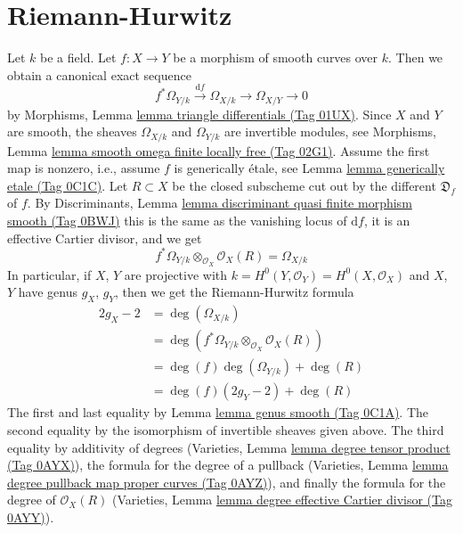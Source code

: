 \documentclass{amsart}
\theoremstyle{plain}
\theoremstyle{definition}
\theoremstyle{remark}
\numberwithin{equation}{subsection}
\begin{document}
\section{Riemann-Hurwitz}
\label{section-riemann-hurewitz}

\noindent
Let $k$ be a field. Let $f : X \to Y$ be a morphism of smooth curves over $k$.
Then we obtain a canonical exact sequence
$$
f^*\Omega_{Y/k} \xrightarrow{\text{d}f} \Omega_{X/k}
\longrightarrow \Omega_{X/Y} \longrightarrow 0
$$
by Morphisms, Lemma \href{https://stacks.math.columbia.edu/tag/01UX}{lemma triangle differentials (Tag 01UX)}.
Since $X$ and $Y$ are smooth, the sheaves $\Omega_{X/k}$ and
$\Omega_{Y/k}$ are invertible modules, see
Morphisms, Lemma \href{https://stacks.math.columbia.edu/tag/02G1}{lemma smooth omega finite locally free (Tag 02G1)}.
Assume the first map is nonzero, i.e., assume $f$ is generically
\'etale, see Lemma \href{https://stacks.math.columbia.edu/tag/0C1C}{lemma generically etale (Tag 0C1C)}. Let $R \subset X$
be the closed subscheme cut out by the different $\mathfrak{D}_f$ of $f$.
By Discriminants, Lemma
\href{https://stacks.math.columbia.edu/tag/0BWJ}{lemma discriminant quasi finite morphism smooth (Tag 0BWJ)}
this is the same as the vanishing locus of $\text{d}f$, it is
an effective Cartier divisor, and we get
$$
f^*\Omega_{Y/k} \otimes_{\mathcal{O}_X} \mathcal{O}_X(R) = \Omega_{X/k}
$$
In particular, if $X$, $Y$ are projective with
$k = H^0(Y, \mathcal{O}_Y) = H^0(X, \mathcal{O}_X)$
and $X$, $Y$ have genus $g_X$, $g_Y$, then we get the
Riemann-Hurwitz formula
\begin{align*}
2g_X - 2 & =
\deg(\Omega_{X/k}) \\
& =
\deg(f^*\Omega_{Y/k} \otimes_{\mathcal{O}_X} \mathcal{O}_X(R)) \\
& =
\deg(f) \deg(\Omega_{Y/k}) + \deg(R) \\
& =
\deg(f) (2g_Y - 2) + \deg(R)
\end{align*}
The first and last equality by Lemma \href{https://stacks.math.columbia.edu/tag/0C1A}{lemma genus smooth (Tag 0C1A)}.
The second equality by the isomorphism of invertible sheaves given above.
The third equality by additivity of degrees
(Varieties, Lemma \href{https://stacks.math.columbia.edu/tag/0AYX}{lemma degree tensor product (Tag 0AYX)}),
the formula for the degree of a pullback
(Varieties, Lemma \href{https://stacks.math.columbia.edu/tag/0AYZ}{lemma degree pullback map proper curves (Tag 0AYZ)}),
and finally the formula for the degree of $\mathcal{O}_X(R)$
(Varieties, Lemma \href{https://stacks.math.columbia.edu/tag/0AYY}{lemma degree effective Cartier divisor (Tag 0AYY)}).
\end{document}
